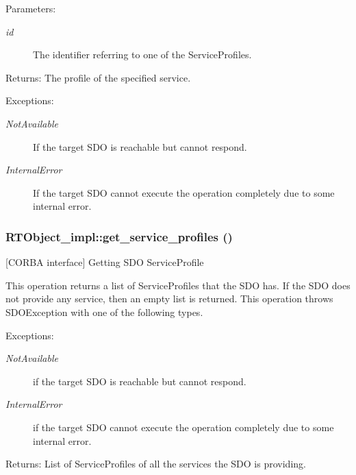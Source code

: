 \begin{Desc}
\item[Parameters:]
\begin{description}
\item[{\em id}]The identifier referring to one of the Service\-Profiles. \end{description}
\end{Desc}
\begin{Desc}
\item[Returns:]The profile of the specified service. \end{Desc}
\begin{Desc}
\item[Exceptions:]
\begin{description}
\item[{\em Not\-Available}]If the target SDO is reachable but cannot respond. \item[{\em Internal\-Error}]If the target SDO cannot execute the operation completely due to some internal error.\end{description}
\end{Desc}
\subsubsection{\setlength{\rightskip}{0pt plus 5cm}RTObject\_\-impl::get\_\-service\_\-profiles ()}\label{classRTObject__impl_RTObject__impla40}


[CORBA interface] Getting SDO Service\-Profile 

This operation returns a list of Service\-Profiles that the SDO has. If the SDO does not provide any service, then an empty list is returned. This operation throws SDOException with one of the following types.

\begin{Desc}
\item[Exceptions:]
\begin{description}
\item[{\em Not\-Available}]if the target SDO is reachable but cannot respond. \item[{\em Internal\-Error}]if the target SDO cannot execute the operation completely due to some internal error. \end{description}
\end{Desc}
\begin{Desc}
\item[Returns:]List of Service\-Profiles of all the services the SDO is providing.\end{Desc}
